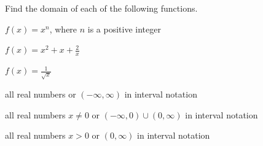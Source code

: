 \begin{exercise}
Find the domain of each of the following functions.


\begin{parts}
\item $f(x)=x^n$, where $n$ is a positive integer
\item $f(x)=x^2+x+\frac{2}{x}$
\item $f(x)=\frac{1}{\sqrt{x}}$
\end{parts}
\end{exercise}


\begin{solution}

\begin{parts}
\item all real numbers or $(-\infty,\infty)$ in interval notation
\item all real numbers $x\neq0$ or $(-\infty,0)\cup(0,\infty)$ in interval notation
\item all real numbers $x> 0$ or $(0,\infty)$ in interval notation
\end{parts}
\end{solution}











